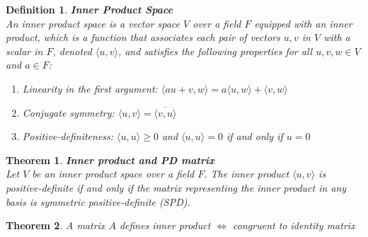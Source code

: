 \documentclass[11pt]{book} %
\newtheorem{theorem}{Theorem}[section]
\newtheorem{definition}{Definition}[section]
\begin{document}
\begin{definition}{\textbf{Inner Product Space}} \\
    An inner product space is a vector space \( V \) over a field \( F \) equipped with an inner product, which is a function that associates each pair of vectors \( u, v \) in \( V \) with a scalar in \( F \), denoted \( \langle u, v \rangle \), and satisfies the following properties for all \( u, v, w \in V \) and \( a \in F \):
    \begin{enumerate}
        \item Linearity in the first argument: \( \langle au + v, w \rangle = a \langle u, w \rangle + \langle v, w \rangle \)
        \item Conjugate symmetry: \( \langle u, v \rangle = \overline{\langle v, u \rangle} \)
        \item Positive-definiteness: \( \langle u, u \rangle \geq 0 \) and \( \langle u, u \rangle = 0 \) if and only if \( u = 0 \)
    \end{enumerate}
\end{definition}


\begin{theorem}{\textbf{Inner product and PD matrix}} \\
    Let \( V \) be an inner product space over a field \( F \). The inner product \( \langle u, v \rangle \) is positive-definite if and only if 
    the matrix representing the inner product in any basis is symmetric positive-definite (SPD).
\end{theorem}

\begin{theorem}{A matrix \( A \) defines inner product $\iff$ congruent to identity matrix} \\
\end{theorem}
\end{document}
